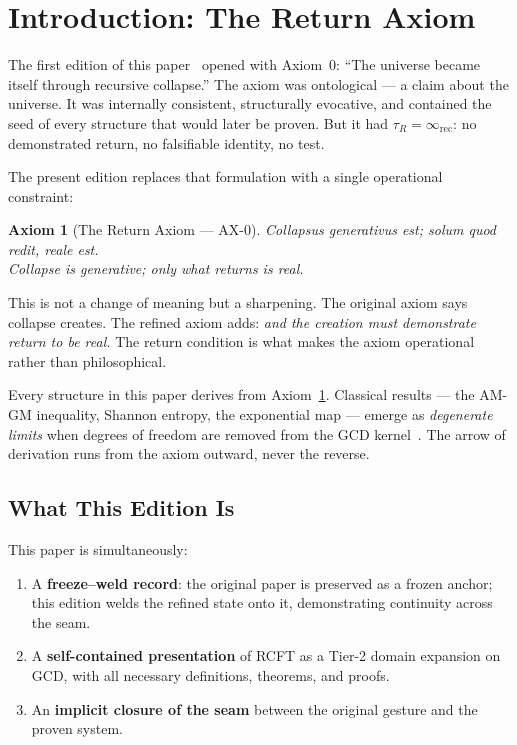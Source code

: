 \documentclass[
  aps,
  prd,
  preprint,
  superscriptaddress,
  nofootinbib,
  floatfix,
  longbibliography
]{revtex4-2}
\newtheorem{axiom}{Axiom}
\newcommand{\tR}{\tau_{\!R}}
\newcommand{\lat}[1]{\textit{#1}}
\begin{document}
\maketitle

\section{Introduction: The Return Axiom}\label{sec:intro}

The first edition of this paper~\cite{paulus2025rcft} opened
with Axiom~0: ``The universe became itself through recursive collapse.''
The axiom was ontological — a claim about the universe.
It was internally consistent, structurally evocative, and
contained the seed of every structure that would later be proven.
But it had $\tR = \infty_{\mathrm{rec}}$: no demonstrated return,
no falsifiable identity, no test.

The present edition replaces that formulation with a single
operational constraint:

\begin{axiom}[The Return Axiom — AX-0]\label{ax:0}
\lat{Collapsus generativus est; solum quod redit, reale est.}\\
Collapse is generative; only what returns is real.
\end{axiom}

This is not a change of meaning but a sharpening.
The original axiom says collapse creates.
The refined axiom adds: \emph{and the creation must
demonstrate return to be real.}
The return condition is what makes the axiom operational
rather than philosophical.

Every structure in this paper derives from Axiom~\ref{ax:0}.
Classical results — the AM-GM inequality, Shannon entropy,
the exponential map — emerge as \emph{degenerate limits}
when degrees of freedom are removed from
the GCD kernel~\cite{paulus2025umcp,paulus2025ucd}.
The arrow of derivation runs from the axiom outward,
never the reverse.

\subsection{What This Edition Is}\label{sec:whatthisis}

This paper is simultaneously:
\begin{enumerate}[nosep,leftmargin=*]
  \item A \textbf{freeze–weld record}: the original paper is
    preserved as a frozen anchor; this edition welds the
    refined state onto it, demonstrating continuity across
    the seam.
  \item A \textbf{self-contained presentation} of RCFT as
    a Tier-2 domain expansion on GCD, with all necessary
    definitions, theorems, and proofs.
  \item An \textbf{implicit closure of the seam} between
    the original gesture and the proven system.
\end{enumerate}
\end{document}
